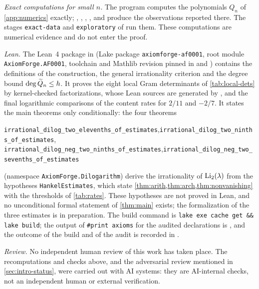 \emph{Exact computations for small $n$.} The program  computes the polynomials $Q_n$ of \cref{app:numerics} exactly; , , , ,  and  produce the observations reported there. The stages \texttt{exact-data} and \texttt{exploratory} of  run them. These computations are numerical evidence and do not enter the proof.

\emph{Lean.} The Lean~4 package in  (Lake package \texttt{axiomforge-af0001}, root module \texttt{AxiomForge.AF0001}, toolchain and Mathlib revision pinned in  and ) contains the definitions of the construction, the general irrationality criterion and the degree bound $\deg\widetilde{Q}_n\le h$. It proves the eight local Gram determinants of \cref{tab:local-dets} by kernel-checked factorizations, whose Lean sources are generated by , and the final logarithmic comparisons of the content rates for $2/11$ and $-2/7$. It states the main theorems only conditionally: the four theorems
\begin{center}\small
\texttt{irrational\_dilog\_two\_elevenths\_of\_estimates},\quad \texttt{irrational\_dilog\_two\_ninths\_of\_estimates},\\
\texttt{irrational\_dilog\_neg\_two\_ninths\_of\_estimates},\quad \texttt{irrational\_dilog\_neg\_two\_sevenths\_of\_estimates}
\end{center}
(namespace \texttt{AxiomForge.Dilogarithm}) derive the irrationality of $\operatorname{Li}_2(\lambda)$ from the hypotheses \texttt{HankelEstimates}, which state \cref{thm:arith,thm:arch,thm:nonvanishing} with the thresholds of \cref{tab:rates}. These hypotheses are not proved in Lean, and no unconditional formal statement of \cref{thm:main} exists; the formalization of the three estimates is in preparation. The build command is \texttt{lake exe cache get \&\& lake build}; the output of \texttt{\#print axioms} for the audited declarations is , and the outcome of the build and of the audit is recorded in .

\emph{Review.} No independent human review of this work has taken place. The recomputations and checks above, and the adversarial review mentioned in \cref{sec:intro-status}, were carried out with AI systems: they are AI-internal checks, not an independent human or external verification.

